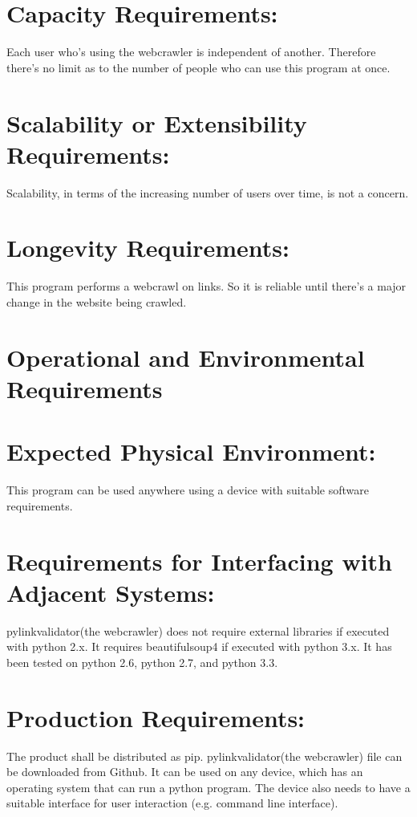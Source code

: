 \documentclass[12pt]{article}
\begin{document}
\section*{Capacity Requirements:}
Each user who’s using the webcrawler is independent of another. Therefore there’s no limit as to the number of people who can use this program at once.

\section*{Scalability or Extensibility Requirements:}
Scalability, in terms of the increasing number of users over time, is not a concern.

\section*{Longevity Requirements:}
This program performs a webcrawl on links. So it is reliable until there’s a major change in the website being crawled.

\section*{Operational and Environmental Requirements }

\section*{Expected Physical Environment:}
This program can be used anywhere using a device with suitable software requirements. 

\section*{Requirements for Interfacing with Adjacent Systems:}
pylinkvalidator(the webcrawler) does not require external libraries if executed with python 2.x. It requires beautifulsoup4 if executed with python 3.x. It has been tested on python 2.6, python 2.7, and python 3.3.


\section*{Production Requirements:}

The product shall be distributed as pip. pylinkvalidator(the webcrawler) file can be downloaded from Github. It can be used on any device, which has an operating system that can run a python program. The device also needs to have a suitable interface for user interaction (e.g. command line interface).
\end{document}
